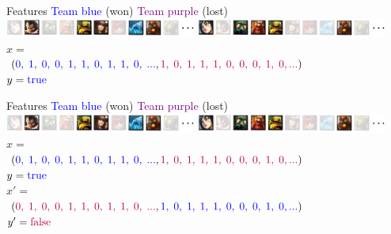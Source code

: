 \begin{frame}{Features}
\centering
\textcolor{blue}{Team blue} (won) \hspace{40pt} \textcolor{purple}{Team purple} (lost)\\
\includegraphics[width=0.47\textwidth]{img/kent/pickblue.png}\hspace{2pt}%
\includegraphics[width=0.47\textwidth]{img/kent/pickpurple.png}\\
\vspace{18pt}
$x =$\\
\hspace{2pt} $(\textcolor{blue}{0,\;1,\;0,\;0,\;1,\;1,\;0,\;1,\;1,\;0,\;...},\textcolor{purple}{1,\;0,\;1,\;1,\;1,\;0,\;0,\;0,\;1,\;0,...})$\\
\vspace{18pt}
$y = \textcolor{blue}{\text{true}}$
\end{frame}

\begin{frame}{Features}
\centering
\textcolor{blue}{Team blue} (won) \hspace{40pt} \textcolor{purple}{Team purple} (lost)\\
\includegraphics[width=0.47\textwidth]{img/kent/pickblue.png}\hspace{2pt}%
\includegraphics[width=0.47\textwidth]{img/kent/pickpurple.png}\\
\vspace{18pt}
$x =$\\
\hspace{2pt} $(\textcolor{blue}{0,\;1,\;0,\;0,\;1,\;1,\;0,\;1,\;1,\;0,\;...},\textcolor{purple}{1,\;0,\;1,\;1,\;1,\;0,\;0,\;0,\;1,\;0,...})$\\
$y = \textcolor{blue}{\text{true}}$\\
\vspace{18pt}
$x' =$\\
\hspace{2pt} $(\textcolor{purple}{0,\;1,\;0,\;0,\;1,\;1,\;0,\;1,\;1,\;0,\;...},\textcolor{blue}{1,\;0,\;1,\;1,\;1,\;0,\;0,\;0,\;1,\;0,...})$\\
$y' = \textcolor{purple}{\text{false}}$
\end{frame}

